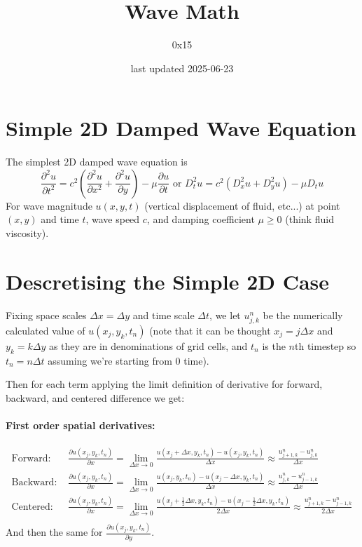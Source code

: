 \documentclass{article}
\title{Wave Math}
\date{last updated 2025-06-23}
\author{0x15}
\begin{document}
\maketitle

\section{Simple 2D Damped Wave Equation}
The simplest 2D damped wave equation is
$$
	\frac{\partial^2 u}{\partial t^2} = c^2 \left(\frac{\partial^2 u}{\partial x^2} + \frac{\partial^2 u}{\partial y} \right) - \mu \frac{\partial u}{\partial t} \text{ or } D_t^2 u = c^2 (D_x^2 u + D_y^2 u) - \mu D_t u
$$
For wave magnitude $u(x,y,t)$ (vertical displacement of fluid, etc...) at point $(x, y)$ and time $t$, wave speed $c$, and damping coefficient $\mu \ge 0$ (think fluid viscosity).

\section{Descretising the Simple 2D Case}
Fixing space scales $\Delta x = \Delta y$ and time scale $\Delta t$, we let $u_{j,k}^n$ be the numerically calculated value of $u(x_j, y_k, t_n)$ (note that it can be thought $x_j = j \Delta x$ and $y_k = k \Delta y$ as they are in denominations of grid cells, and $t_n$ is the $n$th timestep so $t_n = n \Delta t$ assuming we're starting from 0 time).

Then for each term applying the limit definition of derivative for forward, backward, and centered difference we get:
\paragraph{First order spatial derivatives:}
$$
\begin{aligned}
	\text{Forward: } & \frac{\partial u(x_j, y_k, t_n)}{\partial x} = \lim_{\Delta x \rightarrow 0} \frac{u(x_j + \Delta x, y_k, t_n) - u(x_j, y_k, t_n)}{\Delta x} \approx \frac{u_{j+1, k}^n - u_{j,k}^n}{\Delta x} \\
	\text{Backward: } & \frac{\partial u(x_j, y_k, t_n)}{\partial x} = \lim_{\Delta x \rightarrow 0} \frac{u(x_j, y_k, t_n) - u(x_j - \Delta x, y_k, t_n)}{\Delta x} \approx \frac{u_{j,k}^n - u_{j-1, k}^n}{\Delta x} \\
	\text{Centered: } & \frac{\partial u(x_j, y_k, t_n)}{\partial x} = \lim_{\Delta x \rightarrow 0} \frac{u(x_j + \frac{1}{2} \Delta x, y_k, t_n) - u(x_j - \frac{1}{2} \Delta x, y_k, t_n)}{2 \Delta x} \approx \frac{u_{j+1,k}^n - u_{j-1, k}^n}{2 \Delta x} \\
\end{aligned}
$$
And then the same for $\frac{\partial u(x_j, y_k, t_n)}{\partial y}$.
\end{document}
